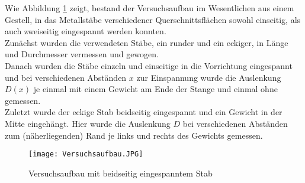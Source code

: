 Wie Abbildung \ref{Versuchsaufbau} zeigt, bestand der Versuchsaufbau im Wesentlichen aus einem Gestell, in das Metallstäbe verschiedener Querschnittsflächen sowohl einseitig, als auch zweiseitig eingespannt werden konnten. \\
Zunächst wurden die verwendeten Stäbe, ein runder und ein eckiger, in Länge und Durchmesser vermessen und gewogen. \\
Danach wurden die Stäbe einzeln und einseitige in die Vorrichtung eingespannt und bei verschiedenen Abständen $x$ zur Einspannung wurde die Auslenkung $D(x)$ je einmal mit einem Gewicht am Ende der Stange und einmal ohne gemessen. \\
Zuletzt wurde der eckige Stab beidseitig eingespannt und ein Gewicht in der Mitte eingehängt. Hier wurde die Auslenkung $D$ bei verschiedenen Abständen zum (näherliegenden) Rand je links und rechts des Gewichts gemessen.
\begin{figure}[ht!]
	\centering
	\texttt{[image: Versuchsaufbau.JPG]}
	\caption{Versuchsaufbau mit beidseitig eingespanntem Stab}
	\label{Versuchsaufbau}
\end{figure}